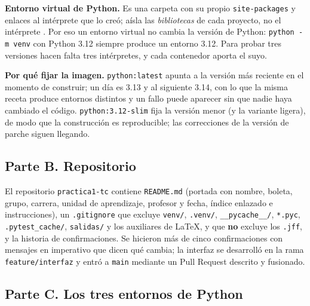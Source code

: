 \textbf{Entorno virtual de Python.} Es una carpeta con su propio \texttt{site-packages} y enlaces al intérprete que lo creó; aísla las \emph{bibliotecas} de cada proyecto, no el intérprete \autocite{pythonvenv2026}. Por eso un entorno virtual no cambia la versión de Python: \texttt{python\ -m\ venv} con Python 3.12 siempre produce un entorno 3.12. Para probar tres versiones hacen falta tres intérpretes, y cada contenedor aporta el suyo.

\textbf{Por qué fijar la imagen.} \texttt{python:latest} apunta a la versión más reciente en el momento de construir; un día es 3.13 y al siguiente 3.14, con lo que la misma receta produce entornos distintos y un fallo puede aparecer sin que nadie haya cambiado el código. \texttt{python:3.12-slim} fija la versión menor (y la variante ligera), de modo que la construcción es reproducible; las correcciones de la versión de parche siguen llegando.

\hypertarget{parte-b.-repositorio}{%
\subsection{Parte B. Repositorio}\label{parte-b.-repositorio}}

El repositorio \texttt{practica1-tc} contiene \texttt{README.md} (portada con nombre, boleta, grupo, carrera, unidad de aprendizaje, profesor y fecha, índice enlazado e instrucciones), un \texttt{.gitignore} que excluye \texttt{venv/}, \texttt{.venv/}, \texttt{\_\_pycache\_\_/}, \texttt{*.pyc}, \texttt{.pytest\_cache/}, \texttt{salidas/} y los auxiliares de LaTeX, y que \textbf{no} excluye los \texttt{.jff}, y la historia de confirmaciones. Se hicieron más de cinco confirmaciones con mensajes en imperativo que dicen qué cambia; la interfaz se desarrolló en la rama \texttt{feature/interfaz} y entró a \texttt{main} mediante un Pull Request descrito y fusionado.



\hypertarget{parte-c.-los-tres-entornos-de-python}{%
\subsection{Parte C. Los tres entornos de Python}\label{parte-c.-los-tres-entornos-de-python}}

